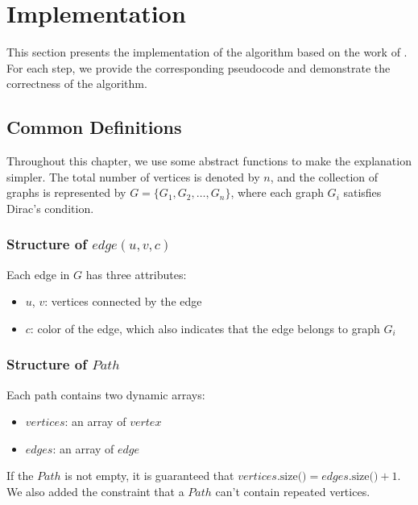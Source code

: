 
\chapter{Implementation}

This section presents the implementation of the algorithm based on the work of \cite{Joos_2020}. For each step, we provide the corresponding pseudocode and demonstrate the correctness of the algorithm.

\section{Common Definitions}

Throughout this chapter, we use some abstract functions to make the explanation simpler. The total number of vertices is denoted by $n$, and the collection of graphs is represented by $G = \{G_1, G_2, \dots, G_n\}$, where each graph $G_i$ satisfies Dirac's condition.

\subsection{Structure of $edge(u, v, c)$}

Each edge in $G$ has three attributes:

\begin{itemize}
    \item $u$, $v$: vertices connected by the edge
    \item $c$: color of the edge, which also indicates that the edge belongs to graph $G_i$
\end{itemize}

\subsection{Structure of $Path$}

Each path contains two dynamic arrays:

\begin{itemize}
    \item $vertices$: an array of $vertex$
    \item $edges$: an array of $edge$
\end{itemize}

If the $Path$ is not empty, it is guaranteed that 
$vertices\text{.size()} = edges\text{.size()} + 1$. We 
also added the constraint that a $Path$ can't contain repeated 
vertices.

